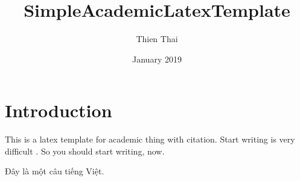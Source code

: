 \documentclass{article}
\title{SimpleAcademicLatexTemplate}
\author{Thien Thai}
\date{January 2019}
\begin{document}
\maketitle

\section{Introduction}

This is a latex template for academic thing with citation. Start writing is very difficult \cite{molloy1983unsuccessful}. So you should start writing, now.

Đây là một câu tiếng Việt.





\end{document}
